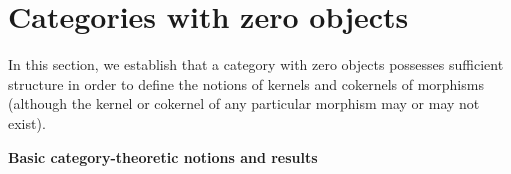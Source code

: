 

\section{Categories with zero objects}
\setcounter{theorem}{0}
\setcounter{equation}{0}


\renewcommand{\theenumi}{\roman{enumi}}
\renewcommand{\labelenumi}{\textnormal{(\theenumi)}$\;\;$}


In this section, we establish that a category with zero objects possesses sufficient structure
in order to define the notions of kernels and cokernels of morphisms
(although the kernel or cokernel of any particular morphism may or may not exist).


\vskip 0.5cm
\noindent
\textbf{\large Basic category-theoretic notions and results}


